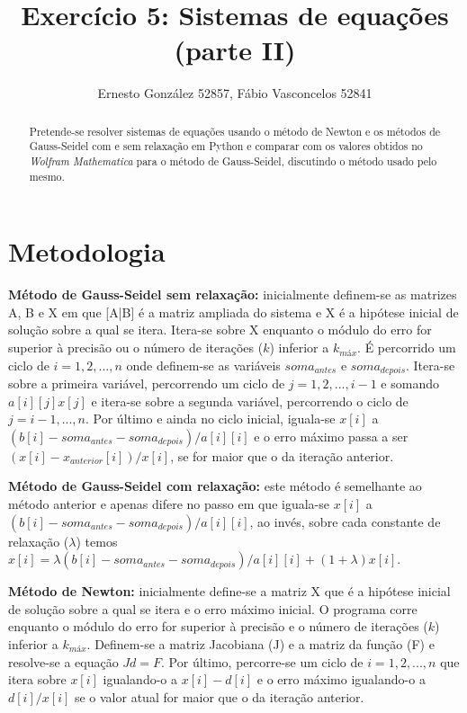 \documentclass[aps,pre,twocolumn,showpacs,amsmath,amssymb]{revtex4-1}
\begin{document}
\title{Exercício 5: Sistemas de equações (parte II)}

\author{Ernesto González 52857, Fábio Vasconcelos 52841}

\begin{abstract}

  Pretende-se resolver sistemas de equações usando o método de Newton e os métodos de Gauss-Seidel com e sem relaxação em Python e comparar com os valores obtidos no {\it Wolfram Mathematica} para o método de Gauss-Seidel, discutindo o método usado pelo mesmo.

\end{abstract}

\maketitle

\section{Metodologia}

{\bf Método de Gauss-Seidel sem relaxação:} inicialmente definem-se as matrizes A, B e X em que [A|B] é a matriz ampliada do sistema e X é a hipótese inicial de solução sobre a qual se itera. Itera-se sobre X enquanto o módulo do erro for superior à precisão ou o número de iterações ($k$) inferior a $k_{máx}$. É percorrido um ciclo de $i=1,2,...,n$ onde definem-se as variáveis $soma_{antes}$ e $soma_{depois}$. Itera-se sobre a primeira variável, percorrendo um ciclo de $j=1,2,...,i-1$ e somando $a[i][j]x[j]$ e itera-se sobre a segunda variável, percorrendo o ciclo de $j=i-1,...,n$. Por último e ainda no ciclo inicial, iguala-se $x[i]$ a $(b[i]-soma_{antes}-soma_{depois})/a[i][i]$ e o erro máximo passa a ser $(x[i]-x_{anterior}[i])/x[i]$, se for maior que o da iteração anterior.

{\bf Método de Gauss-Seidel com relaxação:} este método é semelhante ao método anterior e apenas difere no passo em que iguala-se $x[i]$ a $(b[i]-soma_{antes}-soma_{depois})/a[i][i]$, ao invés, sobre cada constante de relaxação ($\lambda$) temos $x[i]=\lambda(b[i]-soma_{antes}-soma_{depois})/a[i][i]+(1+\lambda)x[i]$.

{\bf Método de Newton:} inicialmente define-se a matriz X que é a hipótese inicial de solução sobre a qual se itera e o erro máximo inicial. O programa corre enquanto o módulo do erro for superior à precisão e o número de iterações ($k$) inferior a $k_{máx}$. Definem-se a matriz Jacobiana (J) e a matriz da função (F) e resolve-se a equação $Jd=F$. Por último, percorre-se um ciclo  de $i=1,2,...,n$ que itera sobre $x[i]$ igualando-o a $x[i]-d[i]$ e o erro máximo igualando-o a $d[i]/x[i]$ se o valor atual for maior que o da iteração anterior.
\end{document}

